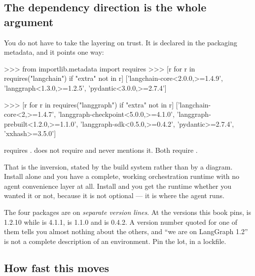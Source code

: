 \subsection{The dependency direction is the whole argument}
\label{sec:dependency-direction}

You do not have to take the layering on trust. It is declared in the packaging
metadata, and it points one way:

\begin{python}[caption={The declared dependencies, read from the installed distributions}, label={lst:deps}]
>>> from importlib.metadata import requires
>>> [r for r in requires("langchain") if "extra" not in r]
['langchain-core<2.0.0,>=1.4.9', 'langgraph<1.3.0,>=1.2.5', 'pydantic<3.0.0,>=2.7.4']

>>> [r for r in requires("langgraph") if "extra" not in r]
['langchain-core<2,>=1.4.7', 'langgraph-checkpoint<5.0.0,>=4.1.0',
 'langgraph-prebuilt<1.2.0,>=1.1.0', 'langgraph-sdk<0.5.0,>=0.4.2',
 'pydantic>=2.7.4', 'xxhash>=3.5.0']
\end{python}

 requires .  does not require
 and never mentions it. Both require .

That is the inversion, stated by the build system rather than by a diagram.
Install  alone and you have a complete, working orchestration
runtime with no agent convenience layer at all. Install  and you
get the runtime whether you wanted it or not, because it is not optional --- it
is where the agent runs.

\begin{warning}
The four  packages are on \emph{separate version lines}. At the
versions this book pins,  is 1.2.10 while
 is 4.1.1,  is 1.1.0 and
 is 0.4.2. A version number quoted for one of them tells you
almost nothing about the others, and ``we are on LangGraph 1.2'' is not a
complete description of an environment. Pin the lot, in a lockfile.
\end{warning}

\subsection{How fast this moves}
\label{sec:cadence}

